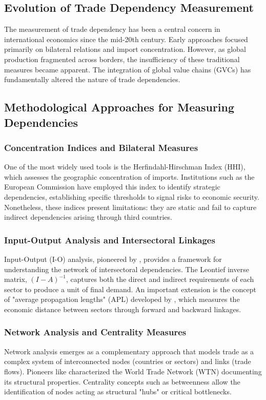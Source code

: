 \documentclass[final,1p,times,authoryear]{elsarticle}
\begin{document}
\subsection{Evolution of Trade Dependency Measurement}
The measurement of trade dependency has been a central concern in international economics since the mid-20th century. Early approaches focused primarily on bilateral relations and import concentration. However, as global production fragmented across borders, the insufficiency of these traditional measures became apparent. The integration of global value chains (GVCs) has fundamentally altered the nature of trade dependencies.

\subsection{Methodological Approaches for Measuring Dependencies}
\subsubsection{Concentration Indices and Bilateral Measures}
One of the most widely used tools is the Herfindahl-Hirschman Index (HHI), which assesses the geographic concentration of imports. Institutions such as the European Commission have employed this index to identify strategic dependencies, establishing specific thresholds to signal risks to economic security. Nonetheless, these indices present limitations: they are static and fail to capture indirect dependencies arising through third countries.

\subsubsection{Input-Output Analysis and Intersectoral Linkages}
Input-Output (I-O) analysis, pioneered by \cite{Leontief1951}, provides a framework for understanding the network of intersectoral dependencies. The Leontief inverse matrix, $(I - A)^{-1}$, captures both the direct and indirect requirements of each sector to produce a unit of final demand. An important extension is the concept of "average propagation lengths" (APL) developed by \cite{Dietzenbacher2005}, which measures the economic distance between sectors through forward and backward linkages.

\subsubsection{Network Analysis and Centrality Measures}
Network analysis emerges as a complementary approach that models trade as a complex system of interconnected nodes (countries or sectors) and links (trade flows). Pioneers like \cite{Fagiolo2010} characterized the World Trade Network (WTN) documenting its structural properties. Centrality concepts such as betweenness allow the identification of nodes acting as structural "hubs" or critical bottlenecks.
\end{document}
